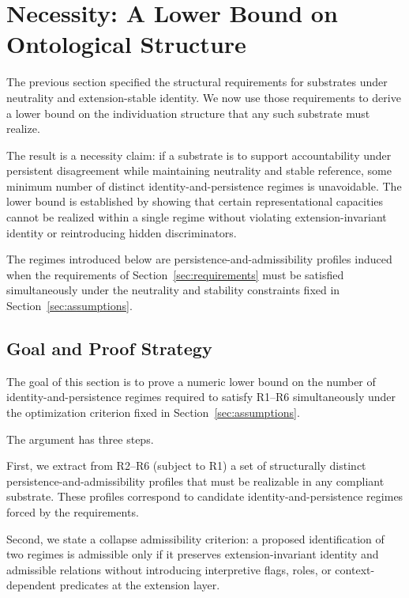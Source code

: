 \section{Necessity: A Lower Bound on Ontological Structure}
\label{sec:necessity}

The previous section specified the structural requirements
for substrates under neutrality and extension-stable identity.
We now use those requirements to derive a lower bound on the
individuation structure that any such substrate must realize.

The result is a necessity claim:
if a substrate is to support accountability under persistent disagreement
while maintaining neutrality and stable reference,
some minimum number of distinct identity-and-persistence regimes is unavoidable.
The lower bound is established by showing that certain representational
capacities cannot be realized within a single regime
without violating extension-invariant identity
or reintroducing hidden discriminators.

The regimes introduced below are persistence-and-admissibility profiles
induced when the requirements of Section~\ref{sec:requirements}
must be satisfied simultaneously under the neutrality and stability
constraints fixed in Section~\ref{sec:assumptions}.

\subsection{Goal and Proof Strategy}
\label{sec:goal_proof_strategy}

The goal of this section is to prove a numeric lower bound
on the number of identity-and-persistence regimes required
to satisfy R1--R6 simultaneously under the optimization criterion
fixed in Section~\ref{sec:assumptions}.

The argument has three steps.

First, we extract from R2--R6 (subject to R1) a set of
structurally distinct persistence-and-admissibility profiles
that must be realizable in any compliant substrate.
These profiles correspond to candidate identity-and-persistence regimes
forced by the requirements.

Second, we state a collapse admissibility criterion:
a proposed identification of two regimes is admissible only if
it preserves extension-invariant identity and admissible relations
without introducing interpretive flags, roles, or context-dependent
predicates at the extension layer.

